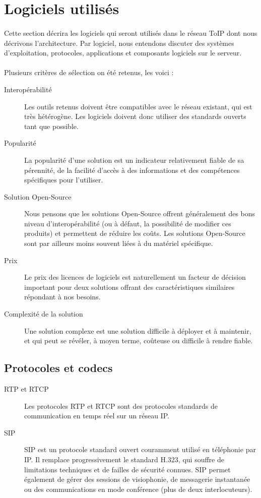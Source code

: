 \section{Logiciels utilisés}

\paragraph{} Cette section décrira les logiciels qui seront utilisés dans le
réseau ToIP dont nous décrivons l'architecture. Par logiciel, nous entendons
discuter des systèmes d'exploitation, protocoles, applications et composants
logiciels sur le serveur.

\paragraph{} Plusieurs critères de sélection on été retenus, les voici :
\begin{description}
	\item[Interopérabilité] Les outils retenus doivent être compatibles avec le
	réseau existant, qui est très hétérogène. Les logiciels doivent donc utiliser
	des standards ouverts tant que possible.
	\item[Popularité] La popularité d'une solution est un indicateur relativement
	fiable de sa pérennité, de la facilité d'accès à des informations et des
	compétences spécifiques pour l'utiliser.
	\item[Solution Open-Source] Nous pensons que les solutions Open-Source
	offrent généralement des bons niveau d'interopérabilité (ou à défaut, la
	possibilité de modifier ces produits) et permettent de réduire les coûts.
	Les solutions Open-Source sont par ailleurs moins souvent liées à du matériel
	spécifique.
	\item[Prix] Le prix des licences de logiciels est naturellement un facteur de
	décision important pour deux solutions offrant des caractéristiques similaires
	répondant à nos besoins.
	\item[Complexité de la solution] Une solution complexe est une solution
	difficile à déployer et à maintenir, et qui peut se révéler, à moyen
	terme, coûteuse ou difficile à rendre fiable.
\end{description}

\subsection{Protocoles et codecs}

\begin{description}
	\item[RTP et RTCP] Les protocoles \ac{RTP} et \ac{RTCP} sont des protocoles
	standards de communication en temps réel sur un réseau IP.
	\item[SIP] \ac{SIP} est un protocole standard ouvert couramment utilisé en
	téléphonie par IP. Il remplace progressivement le standard H.323, qui souffre
	de limitations techniques et de failles de sécurité connues. SIP permet
	également de gérer des sessions de visiophonie, de messagerie instantanée ou
	des communications en mode conférence (plus de deux interlocuteurs).
\end{description}

